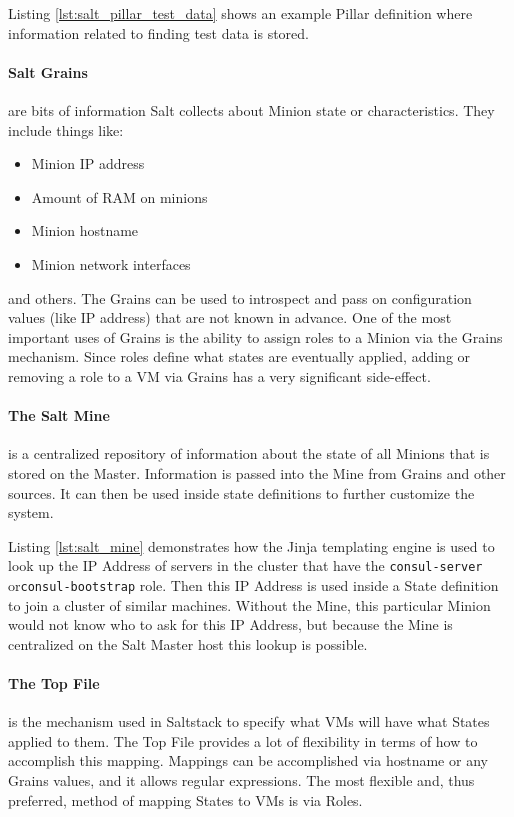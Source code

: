 Listing \ref{lst:salt_pillar_test_data} shows an example Pillar definition where information related to finding test data is stored.

\paragraph{Salt Grains} are bits of information Salt collects about Minion state or characteristics. They include things like:

\begin{itemize}
\item Minion IP address
\item Amount of RAM on minions
\item Minion hostname
\item Minion network interfaces
\end{itemize}

and others. The Grains can be used to introspect and pass on configuration values (like IP address) that are not known in advance. One of the most important uses of Grains is the ability to assign roles to a Minion via the Grains mechanism. Since roles define what states are eventually applied, adding or removing a role to a VM via Grains has a very significant side-effect. 

\paragraph{The Salt Mine} is a centralized repository of information about the state of all Minions that is stored on the Master. Information is passed into the Mine from Grains and other sources. It can then be used inside state definitions to further customize the system.  

Listing \ref{lst:salt_mine} demonstrates how the Jinja templating engine is used to look up the IP Address of servers in the cluster that have the \texttt{consul-server} or\texttt{consul-bootstrap} role. Then this IP Address is used inside a State definition to join a cluster of similar machines. Without the Mine, this particular Minion would not know who to ask for this IP Address, but because the Mine is centralized on the Salt Master host this lookup is possible.

\paragraph{The Top File} is the mechanism used in Saltstack to specify what VMs will have what States applied to them. The Top File provides a lot of flexibility in terms of how to accomplish this mapping. Mappings can be accomplished via hostname or any Grains values, and it allows regular expressions. The most flexible and, thus preferred, method of mapping States to VMs is via Roles.

